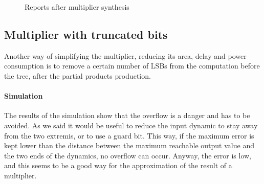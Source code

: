 \documentclass[a4paper]{article}
\begin{document}
	\begin{figure}[H]
		\centering
		\hfill
		\caption{Reports after multiplier synthesis}
	\end{figure}
	\subsection{Multiplier with truncated bits}
	Another way of simplifying the multiplier, reducing its area, delay and power consumption is to remove a certain number of LSBs from the computation before the tree, after the partial products production.

	\paragraph*{Simulation} The results of the simulation show that the overflow is a danger and has to be avoided. As we said it would be useful to reduce the input dynamic to stay away from the two extremis, or to use a guard bit. This way, if the maximum error is kept lower than the distance between the maximum reachable output value and the two ends of the dynamics, no overflow can occur. Anyway, the error is low, and this seems to be a good way for the approximation of the result of a multiplier.
\end{document}
